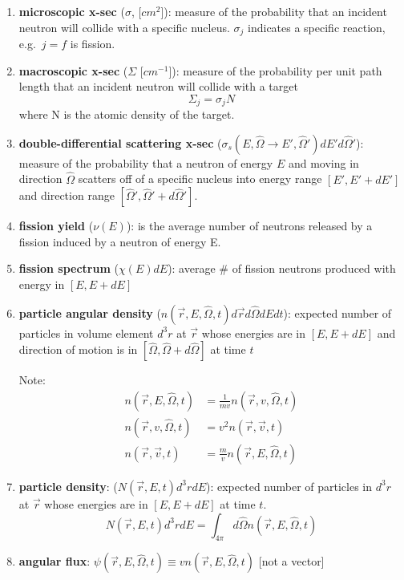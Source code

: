 \documentclass[12pt]{article}
\newcommand{\vOmega}{\ensuremath{\hat{\Omega}}}
\begin{document}
\begin{enumerate}
\item \textbf{microscopic x-sec} ($\sigma$, [$cm^2$]): measure of the probability that an incident neutron will collide with a specific nucleus. $\sigma_j$ indicates a specific reaction, e.g.\ $j=f$ is fission.

\item \textbf{macroscopic x-sec} ($\Sigma$ [$cm^{-1}$]): measure of the probability per unit path length that an incident neutron will collide with a target
\[\Sigma_j = \sigma_j N\]
where N is the atomic density of the target.

\item \textbf{double-differential scattering x-sec} ($\sigma_s(E, \vOmega \rightarrow E', \vOmega')dE' d\vOmega'$): measure of the probability that a neutron of energy $E$ and moving in direction $\vOmega$ scatters off of a specific nucleus into energy range $[E', E' + dE']$ and direction range $[\vOmega', \vOmega' + d\vOmega']$.

\item \textbf{fission yield} ($\nu(E)$): is the average number of neutrons released by a fission induced by a neutron of energy E.

\item \textbf{fission spectrum} ($\chi(E)dE$): average \# of fission neutrons produced with energy in $[E, E + dE]$

\item \textbf{particle angular density} ($n(\vec{r}, E, \vOmega, t)d\vec{r} d\vOmega dE dt$): expected number of particles in volume element $d^3r$ at $\vec{r}$ whose energies are in $[E, E + dE]$ and direction of motion is in $[\vOmega, \vOmega + d\vOmega]$ at time $t$

Note:
\begin{align}
n(\vec{r}, E, \vOmega, t) &= \frac{1}{mv}n(\vec{r}, v, \vOmega, t) \\
n(\vec{r}, v, \vOmega, t) &= v^2 n(\vec{r}, \vec{v}, t) \\
n(\vec{r}, \vec{v}, t) &= \frac{m}{v}n(\vec{r}, E, \vOmega, t)
\end{align}

\item \textbf{particle density}: ($N(\vec{r},E,t)d^3r dE$): expected number of particles in $d^3r$ at $\vec{r}$ whose energies are in $[E, E + dE]$ at time $t$.
\[N(\vec{r},E,t)d^3r dE = \int_{4\pi} d\vOmega n(\vec{r}, E, \vOmega, t) \]

\item \textbf{angular flux}: $\psi(\vec{r}, E, \vOmega, t) \equiv v n(\vec{r}, E, \vOmega, t)$ [not a vector]


\end{enumerate}
\end{document}
